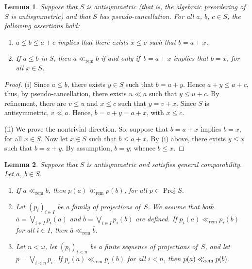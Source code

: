 \documentclass[psamsfonts,reqno]{memo-l}
\theoremstyle{plain}
\newtheorem{lemma}{Lemma}[section]
\theoremstyle{definition}
\theoremstyle{remark}
\numberwithin{equation}{section}
\renewcommand{\iff}{if and only if}
\newcommand{\oll}[1]{\overline{#1}}
\newcommand{\rem}{\ll_{\mathrm{rem}}}
\newcommand{\pup}[1]{\textup{(}{#1}\textup{)}}
\DeclareMathOperator{\BB}{Proj}
\newcommand{\famm}[2]{(#1)_{#2}}
\begin{document}
\begin{lemma}\label{L:GCIVPtr}
Suppose that $S$ is antisymmetric \pup{that is, the algebraic preordering of
$S$ is antisymmetric} and that $S$ has pseudo-cancellation. For all $a$,
$b$, $c\in S$, the following assertions hold:
\begin{enumerate}
\item $a\leq b\leq a+c$ implies that there exists $x\leq c$ such that
$b=a+x$.

\item If $a\leq b$ in $S$, then $a\rem b$ \iff\ $b=a+x$ implies that $b=x$,
for all $x\in S$.
\end{enumerate}

\end{lemma}

\begin{proof}
(i) Since $a\leq b$, there exists $y\in S$ such that $b=a+y$. Hence
$a+y\leq a+c$, thus, by pseudo-cancellation, there exists $u\ll a$ such that
$y\leq u+c$. By refinement, there are $v\leq u$ and $x\leq c$ such that
$y=v+x$. Since $S$ is antisymmetric, $v\ll a$. Hence, $b=a+y=a+x$, with
$x\leq c$.

(ii) We prove the nontrivial direction. So, suppose that $b=a+x$ implies
$b=x$, for all $x\in S$. Now let $x\in S$ such that $b\leq a+x$. By (i)
above, there exists $y\leq x$ such that $b=a+y$. By assumption, $b=y$;
whence $b\leq x$.
\end{proof}

\begin{lemma}\label{L:ProjTr}
Suppose that $S$ is antisymmetric and satisfies general comparability. Let
$a$, $b\in S$.
\begin{enumerate}
\item If $a\rem b$, then $p(a)\rem p(b)$, for all\index{pzzroj@$\BB{S}$}
$p\in\BB{S}$.

\item Let $\famm{p_i}{i\in I}$ be a family of projections
of~$S$. We assume that both $\oll{a}=\bigvee_{i\in I}p_i(a)$ and
$\oll{b}=\bigvee_{i\in I}p_i(b)$ are defined. If $p_i(a)\rem p_i(b)$
for all $i\in I$, then $\oll{a}\rem\oll{b}$.

\item Let $n<\omega$, let $\famm{p_i}{i<n}$ be a finite
sequence of projections of~$S$, and let $p=\bigvee_{i<n}p_i$. If
$p_i(a)\rem p_i(b)$ for all $i<n$, then $p(a)\nobreak\rem\nobreak p(b)$.
\end{enumerate}
\end{lemma}
\end{document}
